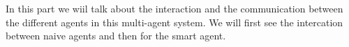 In this part we wiil talk about the interaction and the communication between the different agents in this multi-agent system. We will first see the intercation between naive agents and then for the smart agent.